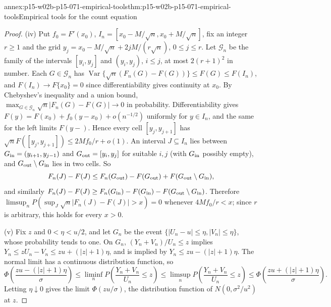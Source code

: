 \begin{annexitem}{annex:p15-w02b-p15-071-empirical-tools}{thm:p15-w02b-p15-071-empirical-tools}{Empirical tools for the count equation}
\begin{proof}
(iv) Put \(f_0=F'(x_0)\), \(I_n=[x_0-M/\sqrt n,x_0+M/\sqrt n]\), fix an
integer \(r\geq1\) and the grid
\(y_j=x_0-M/\sqrt n+2jM/(r\sqrt n)\), \(0\leq j\leq r\). Let
\(\mathcal G_n\) be the family of the intervals \([y_i,y_j]\) and
\((y_i,y_j)\), \(i\leq j\), at most \(2(r+1)^2\) in number. Each
\(G\in\mathcal G_n\) has
\(\operatorname{Var}\{\sqrt n(F_n(G)-F(G))\}\leq F(G)\leq F(I_n)\), and
\(F(I_n)\to F\{x_0\}=0\) since differentiability gives continuity at
\(x_0\). By Chebyshev's inequality and a union bound,
\(\max_{G\in\mathcal G_n}\sqrt n|F_n(G)-F(G)|\to0\) in probability.
Differentiability gives \(F(y)=F(x_0)+f_0(y-x_0)+o(n^{-1/2})\)
uniformly for \(y\in I_n\), and the same for the left limits
\(F(y-)\). Hence every cell \([y_j,y_{j+1}]\) has
\(\sqrt nF([y_j,y_{j+1}])\leq2Mf_0/r+o(1)\). An interval
\(J\subseteq I_n\) lies between \(G_{\rm in}=(y_{i+1},y_{j-1})\) and
\(G_{\rm out}=[y_i,y_j]\) for suitable \(i,j\) (with
\(G_{\rm in}\) possibly empty), and \(G_{\rm out}\setminus G_{\rm in}\)
lies in two cells. So
\[
 F_n(J)-F(J)\leq F_n(G_{\rm out})-F(G_{\rm out})
             +F(G_{\rm out}\setminus G_{\rm in}),
\]
and similarly
\(F_n(J)-F(J)\geq F_n(G_{\rm in})-F(G_{\rm in})
-F(G_{\rm out}\setminus G_{\rm in})\). Therefore
\(\limsup_nP(\sup_J\sqrt n|F_n(J)-F(J)|>x)=0\) whenever
\(4Mf_0/r<x\); since \(r\) is arbitrary, this holds for every \(x>0\).

(v) Fix \(z\) and \(0<\eta<u/2\), and let \(G_n\) be the event
\(\{|U_n-u|\leq\eta,|V_n|\leq\eta\}\), whose probability tends to one.
On \(G_n\), \((Y_n+V_n)/U_n\leq z\) implies
\(Y_n\leq zU_n-V_n\leq zu+(|z|+1)\eta\), and is implied by
\(Y_n\leq zu-(|z|+1)\eta\). The normal limit has a continuous
distribution function, so
\[
 \Phi\!\left(\frac{zu-(|z|+1)\eta}\sigma\right)\leq
 \liminf_nP\!\left(\frac{Y_n+V_n}{U_n}\leq z\right)\leq
 \limsup_nP\!\left(\frac{Y_n+V_n}{U_n}\leq z\right)\leq
 \Phi\!\left(\frac{zu+(|z|+1)\eta}\sigma\right).
\]
Letting \(\eta\downarrow0\) gives the limit \(\Phi(zu/\sigma)\), the
distribution function of \(N(0,\sigma^2/u^2)\) at \(z\).
\end{proof}
\end{annexitem}

